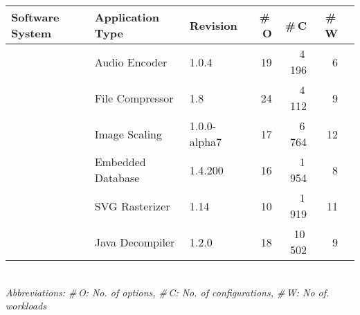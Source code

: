 \begin{tabularx}{\linewidth}{lllrrrr}
		\toprule
		\textbf{Software System} &  \textbf{Application Type} & \textbf{Revision} & \textbf{ \#\,O} & \textbf{\#\,C} & \textbf{\#\,W}  \\
		\midrule
		\rowcolor{blue!5}\jumper & Audio Encoder & 1.0.4 & 19 & 4\,196 & 6   \\
		
		\rowcolor{blue!10}\kanzi & File Compressor & 1.8 & 24 & 4\,112 & 9 \\
			
		\rowcolor{blue!5}\dconvert & Image Scaling & 1.0.0-alpha7 & 17 & 6\,764 & 12  \\
				
		\rowcolor{blue!10}\htwo & Embedded Database & 1.4.200 & 16 & 1\,954  & 8  \\
		
		\rowcolor{blue!5}\batik & SVG Rasterizer & 1.14 & 10 & 1\,919 &  11  \\
		
		\rowcolor{blue!10}\jadx & Java Decompiler & 1.2.0 & 18 & 10\,502 & 9  \\
\bottomrule

\end{tabularx}\\
{\vspace{1mm}\textit{Abbreviations: \#\,O: No. of options, \#\,C: No. of configurations, \#\,W: No of. workloads}}
